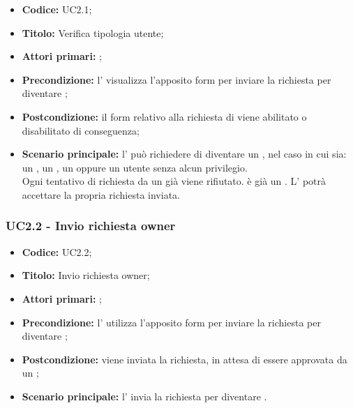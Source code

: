 \documentclass[casi-duso]{subfiles}
\begin{document}
\begin{itemize}
  \item \textbf{Codice:} UC2.1;
  \item \textbf{Titolo:} Verifica tipologia utente;
  \item \textbf{Attori primari:} ;
  \item \textbf{Precondizione:} l' visualizza l'apposito form per inviare la richiesta per diventare ;
  \item \textbf{Postcondizione:} il form relativo alla richiesta di  viene abilitato o disabilitato di conseguenza;
  \item \textbf{Scenario principale:} l' può richiedere di diventare un , nel caso in cui sia:
  un , un , un  oppure un utente senza alcun privilegio. \\
  Ogni tentativo di richiesta da un già  viene rifiutato.
   è già un .
  L' potrà accettare la propria richiesta inviata. 
  

\end{itemize}

\subsubsection{UC2.2 - Invio richiesta owner}
\label{subsub:UC2.2}

\begin{itemize}
  \item \textbf{Codice:} UC2.2;
  \item \textbf{Titolo:} Invio richiesta owner;
  \item \textbf{Attori primari:} ;
  \item \textbf{Precondizione:} l' utilizza l'apposito form per inviare la richiesta per diventare ;
  \item \textbf{Postcondizione:} viene inviata la richiesta, in attesa di essere approvata da un ;
  \item \textbf{Scenario principale:} l' invia la richiesta per diventare .
\end{itemize}
\end{document}

